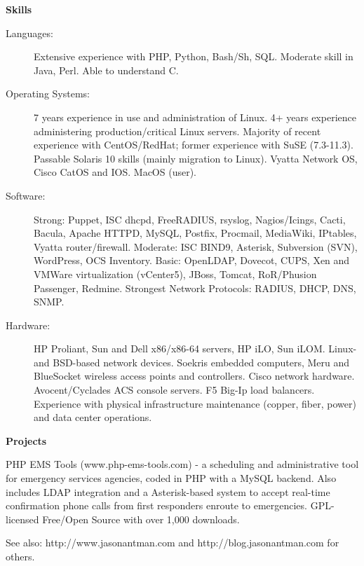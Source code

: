\documentclass[letterpaper,11pt]{article}
\newcommand{\resheading}[1]{{\large \colorbox{mygrey}{\begin{minipage}{\textwidth}{\textbf{#1 \vphantom{p\^{E}}}}\end{minipage}}}}
\begin{document}
\resheading{Skills}

\begin{description}
\item[Languages:]
Extensive experience with PHP, Python, Bash/Sh, SQL. Moderate skill in Java, Perl. Able to understand C.
\item[Operating Systems:]
7 years experience in use and administration of Linux. 4+ years experience administering production/critical Linux servers.
Majority of recent experience with CentOS/RedHat; former experience with SuSE
(7.3-11.3). Passable Solaris 10 skills (mainly migration to Linux). Vyatta Network OS, Cisco CatOS and IOS. MacOS (user).
\item[Software:]
Strong: Puppet, ISC dhcpd, FreeRADIUS, rsyslog, Nagios/Icings, Cacti, Bacula, Apache HTTPD, MySQL, Postfix, Procmail, MediaWiki, IPtables, Vyatta router/firewall. Moderate: ISC BIND9, Asterisk, Subversion (SVN), WordPress, OCS Inventory. Basic: OpenLDAP, Dovecot, CUPS, Xen and VMWare virtualization (vCenter5), JBoss, Tomcat, RoR/Phusion Passenger, Redmine. Strongest Network Protocols: RADIUS, DHCP, DNS, SNMP.


\item[Hardware:]
HP Proliant, Sun and Dell x86/x86-64 servers, HP iLO, Sun iLOM. Linux- and
BSD-based network devices. Soekris embedded computers, Meru and BlueSocket
wireless access points and controllers. Cisco network hardware. Avocent/Cyclades ACS console servers. F5 Big-Ip load balancers. Experience with physical infrastructure maintenance (copper, fiber, power) and data center operations.
\end{description}


\resheading{Projects}

\begin{description}
\item[2007--Present:] PHP EMS Tools (www.php-ems-tools.com) - a scheduling and
  administrative tool for emergency services agencies, coded in PHP with a MySQL
  backend. Also includes LDAP integration and a Asterisk-based system to accept
  real-time confirmation phone calls from first responders enroute to
  emergencies. GPL-licensed Free/Open Source with over 1,000 downloads.
\item See also: http://www.jasonantman.com and http://blog.jasonantman.com for others.

\end{description}
\end{document}
